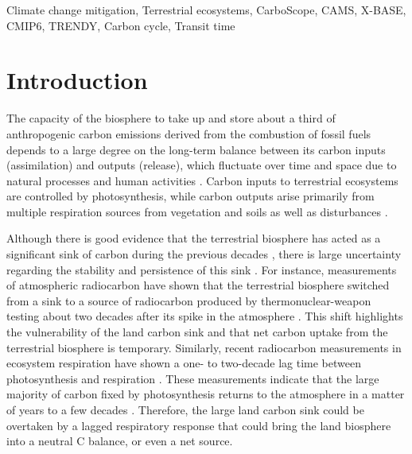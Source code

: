 \documentclass[ProofPDF]{./Styles/Jnls-Template-V3}
\begin{document}
\begin{abstract}[ABSTRACT]
\end{abstract}

\begin{keyword}[KEYWORDS:]

Climate change mitigation, Terrestrial ecosystems, CarboScope, CAMS, X-BASE, CMIP6, TRENDY, Carbon cycle, Transit time
\end{keyword}

\maketitle

\section{Introduction}
The capacity of the biosphere to take up and store about a third of anthropogenic carbon emissions derived from the combustion of fossil fuels \citep{Ruehr2023,Friedlingstein2025} depends to a large degree on the long-term balance between its carbon inputs (assimilation) and outputs (release), which fluctuate over time and space due to natural processes and human activities \citep{Malhi1999}. Carbon inputs to terrestrial ecosystems are controlled by photosynthesis, while carbon outputs arise primarily from multiple respiration sources from vegetation and soils as well as disturbances \citep{Wisniewski1993}. 

Although there is good evidence that the terrestrial biosphere has acted as a significant sink of carbon during the previous decades \citep{Walker2021,Ruehr2023,Sitch2024}, there is large uncertainty regarding the stability and persistence of this sink \citep{Canadell2007,Fernandez-Martinez2023}. For instance, measurements of atmospheric radiocarbon have shown that the terrestrial biosphere switched from a sink to a source of radiocarbon produced by thermonuclear-weapon testing about two decades after its spike in the atmosphere \citep{Naegler2009,Levin2022}. This shift highlights the vulnerability of the land carbon sink and that net carbon uptake from the terrestrial biosphere is temporary. Similarly, recent radiocarbon measurements in ecosystem respiration have shown a one- to two-decade lag time between photosynthesis and respiration \citep{Tangarife2024JGR,Chanca2025, Sierra2026CCCR}. These measurements indicate that the large majority of carbon fixed by photosynthesis returns to the atmosphere in a matter of years to a few decades \citep{Sierra2023PTRS}. Therefore, the large land carbon sink could be overtaken by a lagged respiratory response that could bring the land biosphere into a neutral C balance, or even a net source. 
\end{document}
